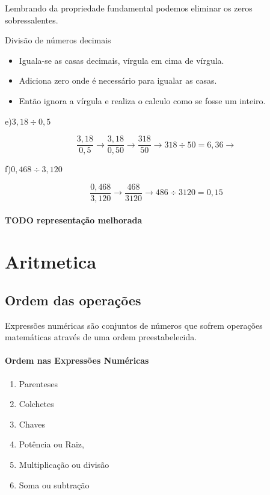 \documentclass[letterpaper]{book}
\begin{document}
Lembrando da propriedade fundamental podemos eliminar os zeros sobressalentes.

Divisão de números decimais

\begin{itemize}
\item Iguala-se as casas decimais, vírgula em cima de vírgula.
\item Adiciona zero onde é necessário para igualar as casas.
\item Então ignora a vírgula e realiza o calculo como se fosse um inteiro.
\end{itemize}

e)\(3,18 \div 0,5\)

\[
\dfrac{3,18}{0,5} \rightarrow
\dfrac{3,18}{0,50} \rightarrow
\dfrac{318}{50} \rightarrow
318 \div 50 = 6,36 \rightarrow
\]

f)$0,468 \div 3,120$

\[
\dfrac{0,468}{3,120} \rightarrow
\dfrac{468}{3120} \rightarrow
486 \div 3120 = 0,15
\]

\paragraph{TODO representação melhorada}


\section{Aritmetica}

\subsection{Ordem das operações}

Expressões numéricas são conjuntos de números que sofrem operações matemáticas através de uma ordem preestabelecida.

\paragraph{Ordem nas Expressões Numéricas}

\begin{enumerate}
\item Parenteses
\item Colchetes 
\item Chaves
\item Potência ou Raiz,
\item Multiplicação ou divisão 
\item Soma ou subtração 
\end{enumerate}
\end{document}
